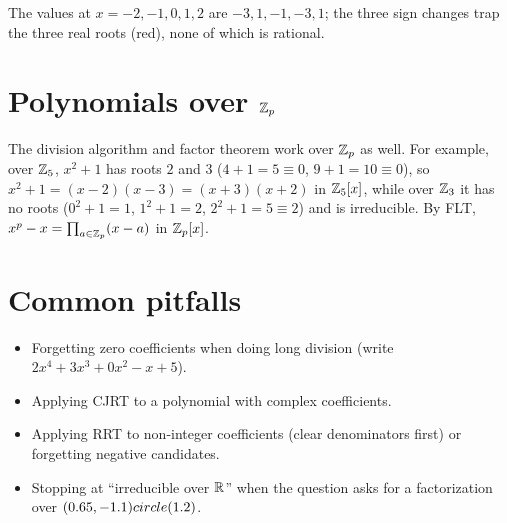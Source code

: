\begin{center}
\end{center}
The values at $x = -2,-1,0,1,2$ are $-3, 1, -1, -3, 1$; the three sign changes trap the
three real roots (red), none of which is rational.

\section{Polynomials over $\mathbb{Z}_{p}$}

The division algorithm and factor theorem work over $\mathbb{Z}_{p}$ as well. For example, over $\mathbb{Z}_{5}$,
$x^2 + 1$ has roots $2$ and $3$ ($4 + 1 = 5 \equiv 0$, $9 + 1 = 10 \equiv 0$), so
$x^2 + 1 = (x - 2)(x - 3) = (x + 3)(x + 2)$ in $\mathbb{Z}_{5}[x]$, while over $\mathbb{Z}_{3}$ it has no roots
($0^2+1=1$, $1^2+1 = 2$, $2^2+1 = 5 \equiv 2$) and is irreducible. By FLT, $x^p - x =
\prod_{a\in\mathbb{Z}_{p}}(x - a)$ in $\mathbb{Z}_{p}[x]$.

\section{Common pitfalls}
\begin{itemize}
  \item Forgetting zero coefficients when doing long division (write $2x^4 + 3x^3 + 0x^2 - x
        + 5$).
  \item Applying CJRT to a polynomial with complex coefficients.
  \item Applying RRT to non-integer coefficients (clear denominators first) or forgetting
        negative candidates.
  \item Stopping at ``irreducible over $\mathbb{R}$'' when the question asks for a factorization over
        $(0.65,-1.1) circle (1.2)$.
\end{itemize}

